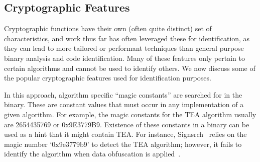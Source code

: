 








\subsection{Cryptographic Features}
\label{sec:cryptobinary-features}
Cryptographic functions have their own (often quite distinct) set of characteristics, and work thus far has often leveraged these for identification, as they can lead to more tailored or performant techniques than general purpose binary analysis and code identification.
Many of these features only pertain to certain algorithms and cannot be used to identify others.
We now discuss some of the popular cryptographic features used for identification purposes.

 In this approach, algorithm specific ``magic constants'' are searched for in the binary.  These are constant values that must occur in any implementation of a given algorithm.
For example, the magic constants for the TEA algorithm usually are 2654435769 or
0x9E3779B9. Existence of these constants in a binary can be used as a hint that it might contain TEA.
For instance, Signsrch~\cite{signsrch} relies on the magic number `0x9e3779b9' to detect the TEA algorithm; however, it fails to identify the algorithm when data obfuscation is applied~\cite{xu2017cryptographic}.

